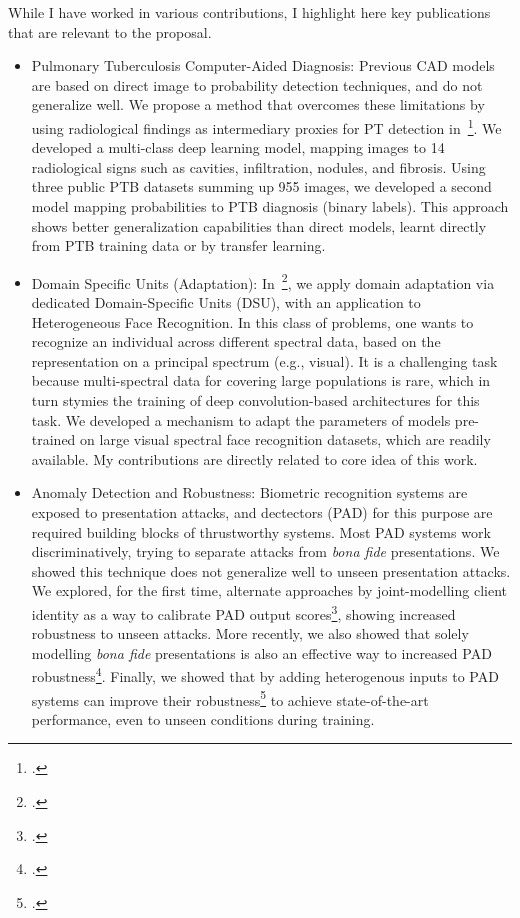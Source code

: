 \documentclass[a4paper,10pt,onecolumn]{article}
\begin{document}
While I have worked in various contributions, I highlight here key publications
that are relevant to the proposal.

\begin{itemize}

    \item Pulmonary Tuberculosis Computer-Aided Diagnosis: Previous CAD models
        are based on direct image to probability detection techniques, and do
        not generalize well.  We propose a method that overcomes these
        limitations by using radiological findings as intermediary proxies for
        PT detection in~\footcite{union-2022}.  We developed a multi-class deep
        learning model, mapping images to 14 radiological signs such as
        cavities, infiltration, nodules, and fibrosis.  Using three public PTB
        datasets summing up 955 images, we developed a second model mapping
        probabilities to PTB diagnosis (binary labels). This approach shows
        better generalization capabilities than direct models, learnt directly
        from PTB training data or by transfer learning.

    \item Domain Specific Units (Adaptation): In~\footcite{tifs-2019}, we apply
        domain adaptation via dedicated Domain-Specific Units (DSU), with an
        application to Heterogeneous Face Recognition.  In this class of
        problems, one wants to recognize an individual across different
        spectral data,  based on the representation on a principal spectrum
        (e.g., visual).  It is a challenging task because multi-spectral data
        for covering large populations is rare, which in turn stymies the
        training of deep convolution-based architectures for this task.  We
        developed a mechanism to adapt the parameters of models pre-trained on
        large visual spectral face recognition datasets, which are readily
        available.  My contributions are directly related to core idea of this
        work.

  \item Anomaly Detection and Robustness: Biometric recognition systems are
      exposed to presentation attacks, and dectectors (PAD) for this purpose
      are required building blocks of thrustworthy systems.  Most PAD systems
      work discriminatively, trying to separate attacks from \textit{bona fide}
      presentations.  We showed this technique does not generalize well to
      unseen presentation attacks.  We explored, for the first time, alternate
      approaches by joint-modelling client identity as a way to calibrate PAD
      output scores\footcite{tifs-2015}, showing increased robustness to unseen
      attacks.  More recently, we also showed that solely modelling
      \textit{bona fide} presentations is also an effective way to increased
      PAD robustness\footcite{icb-2018}.  Finally, we showed that by adding
      heterogenous inputs to PAD systems can improve their
      robustness\footcite{tifs-2019-2} to achieve state-of-the-art performance,
      even to unseen conditions during training.

\end{itemize}
\end{document}
